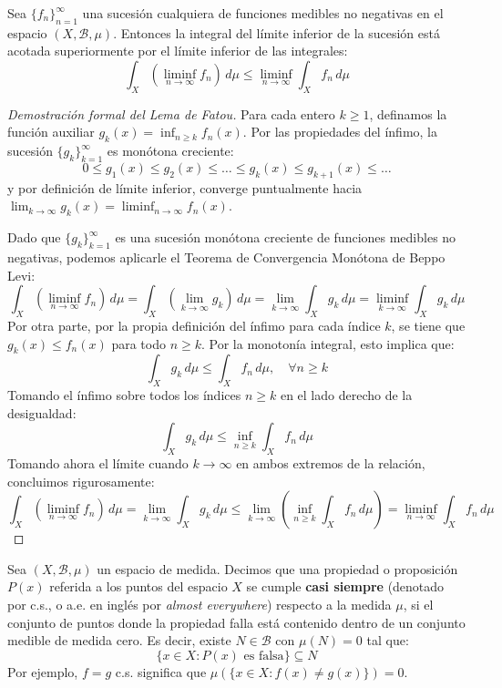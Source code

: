 \begin{lema}
	Sea $\{f_n\}_{n=1}^\infty$ una sucesión cualquiera de funciones medibles no negativas en el espacio $(X, \mathcal{B}, \mu)$. Entonces la integral del límite inferior de la sucesión está acotada superiormente por el límite inferior de las integrales:
	$$ \int_X \left( \liminf_{n \to \infty} f_n \right) \, d\mu \le \liminf_{n \to \infty} \int_X f_n \, d\mu $$
\end{lema}

\begin{proof}[Demostración formal del Lema de Fatou]
	Para cada entero $k \ge 1$, definamos la función auxiliar $g_k(x) = \inf_{n \ge k} f_n(x)$. Por las propiedades del ínfimo, la sucesión $\{g_k\}_{k=1}^\infty$ es monótona creciente:
	$$ 0 \le g_1(x) \le g_2(x) \le \dots \le g_k(x) \le g_{k+1}(x) \le \dots $$
	y por definición de límite inferior, converge puntualmente hacia $\lim_{k \to \infty} g_k(x) = \liminf_{n \to \infty} f_n(x)$.
	
	Dado que $\{g_k\}_{k=1}^\infty$ es una sucesión monótona creciente de funciones medibles no negativas, podemos aplicarle el Teorema de Convergencia Monótona de Beppo Levi:
	$$ \int_X \left( \liminf_{n \to \infty} f_n \right) \, d\mu = \int_X \left( \lim_{k \to \infty} g_k \right) \, d\mu = \lim_{k \to \infty} \int_X g_k \, d\mu = \liminf_{k \to \infty} \int_X g_k \, d\mu $$
	Por otra parte, por la propia definición del ínfimo para cada índice $k$, se tiene que $g_k(x) \le f_n(x)$ para todo $n \ge k$. Por la monotonía integral, esto implica que:
	$$ \int_X g_k \, d\mu \le \int_X f_n \, d\mu, \quad \forall n \ge k $$
	Tomando el ínfimo sobre todos los índices $n \ge k$ en el lado derecho de la desigualdad:
	$$ \int_X g_k \, d\mu \le \inf_{n \ge k} \int_X f_n \, d\mu $$
	Tomando ahora el límite cuando $k \to \infty$ en ambos extremos de la relación, concluimos rigurosamente:
	$$ \int_X \left( \liminf_{n \to \infty} f_n \right) \, d\mu = \lim_{k \to \infty} \int_X g_k \, d\mu \le \lim_{k \to \infty} \left( \inf_{n \ge k} \int_X f_n \, d\mu \right) = \liminf_{n \to \infty} \int_X f_n \, d\mu $$
\end{proof}

\begin{definicion}
	Sea $(X, \mathcal{B}, \mu)$ un espacio de medida. Decimos que una propiedad o proposición $P(x)$ referida a los puntos del espacio $X$ se cumple \textbf{casi siempre} (denotado por c.s., o a.e. en inglés por \textit{almost everywhere}) respecto a la medida $\mu$, si el conjunto de puntos donde la propiedad falla está contenido dentro de un conjunto medible de medida cero. Es decir, existe $N \in \mathcal{B}$ con $\mu(N) = 0$ tal que:
	$$ \{ x \in X : P(x) \text{ es falsa} \} \subseteq N $$
	Por ejemplo, $f = g$ c.s. significa que $\mu(\{x \in X : f(x) \neq g(x)\}) = 0$.
\end{definicion}

